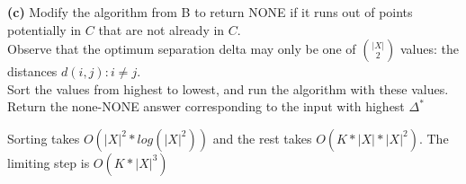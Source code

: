 \documentclass[11pt]{article}
\renewcommand{\part}[1] {\vspace{.10in} {\bf (#1)}}
\begin{document}
\part{c}
Modify the algorithm from B to return NONE if it runs out of points potentially in $C$ that are not already in $C$.\\
Observe that the optimum separation delta may only be one of $\binom{|X|}{2}$ values: the distances $d(i,j) : i \neq j$.\\
Sort the values from highest to lowest, and run the algorithm with these values.\\
Return the none-NONE answer corresponding to the input with highest $\Delta^{*}$

Sorting takes $O(|X|^{2} * log(|X|^2))$ and the rest takes $O(K*|X|*|X|^2)$. The limiting step is $O(K*|X|^3)$
\end{document}
